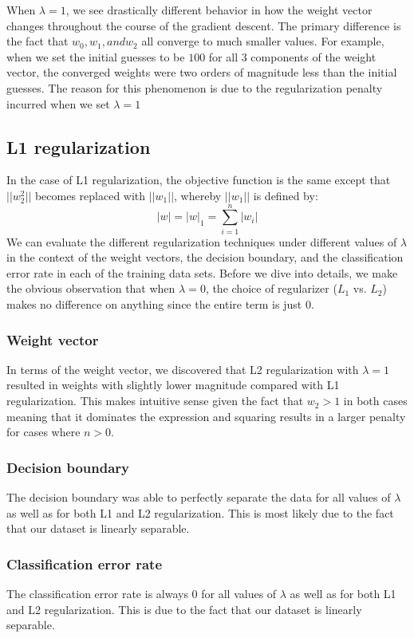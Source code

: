 \documentclass{article}
\begin{document}
When $\lambda = 1$, we see drastically different behavior in how the weight vector changes throughout the course of the gradient descent. The primary difference is the fact that $w_{0}, w_{1}, and w_{2}$ all converge to much smaller values. For example, when we set the initial guesses to be $100$ for all 3 components of the weight vector, the converged weights were two orders of magnitude less than the initial guesses. The reason for this phenomenon is due to the regularization penalty incurred when we set $\lambda = 1$

\subsection{L1 regularization}
In the case of L1 regularization, the objective function is the same except that $||w^2_2||$ becomes replaced with $||w_1||$, whereby $||w_1||$ is defined by:
$$|w| = |w|_1 = \sum_{i=1}^n |w_i|$$
We can evaluate the different regularization techniques under different values of $\lambda$ in the context of the weight vectors, the decision boundary, and the classification error rate in each of the training data sets. Before we dive into details, we make the obvious observation that when $\lambda = 0$, the choice of regularizer ($L_1$ vs. $L_2$) makes no difference on anything since the entire term is just $0$.

\subsubsection{Weight vector}
In terms of the weight vector, we discovered that L2 regularization with $\lambda = 1$ resulted in weights with slightly lower magnitude compared with L1 regularization. This makes intuitive sense given the fact that $w_2 > 1$ in both cases meaning that it dominates the expression and squaring results in a larger penalty for cases where $n>0$.

\subsubsection{Decision boundary}
The decision boundary was able to perfectly separate the data for all values of $\lambda$ as well as for both L1 and L2 regularization. This is most likely due to the fact that our dataset is linearly separable.

\subsubsection{Classification error rate}
The classification error rate is always $0$ for all values of $\lambda$ as well as for both L1 and L2 regularization. This is due to the fact that our dataset is linearly separable.
\end{document}
